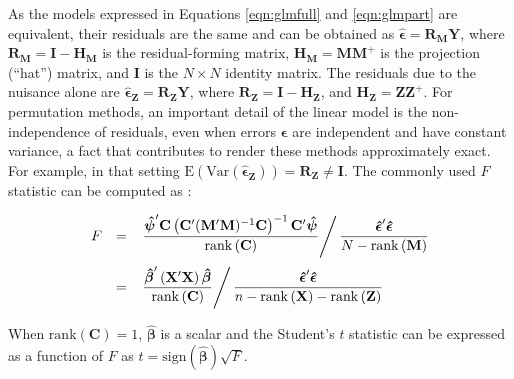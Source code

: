As the models expressed in Equations \ref{eqn:glmfull} and \ref{eqn:glmpart} are equivalent, their residuals are the same and can be obtained as  $\boldsymbol{\hat{\epsilon}} = \mathbf{R}_{\mathbf{M}}\mathbf{Y}$, where $\mathbf{R}_{\mathbf{M}}=\mathbf{I}-\mathbf{H}_{\mathbf{M}}$ is the residual-forming matrix, $\mathbf{H}_{\mathbf{M}}=\mathbf{M}\mathbf{M}^{+}$ is the projection (``hat'') matrix, and $\mathbf{I}$ is the $N \times N$ identity matrix. The residuals due to the nuisance alone are $\boldsymbol{\hat{\epsilon}}_{\mathbf{Z}} = \mathbf{R}_{\mathbf{Z}}\mathbf{Y}$, where $\mathbf{R}_{\mathbf{Z}}=\mathbf{I}-\mathbf{H}_{\mathbf{Z}}$, and $\mathbf{H}_{\mathbf{Z}} = \mathbf{Z}\mathbf{Z}^{+}$. For permutation methods, an important detail of the linear model is the non-independence of residuals, even when errors $\boldsymbol{\epsilon}$ are independent and have constant variance, a fact that contributes to render these methods approximately exact. For example, in that setting $\mathrm{E}\left(\mathrm{Var}(\boldsymbol{\hat{\epsilon}_{\mathbf{Z}}})\right)=\mathbf{R}_{\mathbf{Z}}\neq\mathbf{I}$. The commonly used $F$ statistic can be computed as \citep{Christensen2002}:

\begin{equation}
\begin{array}{ccl}
F &=& \left.\dfrac{\boldsymbol{\hat{\psi}}'\mathbf{C} \left(\mathbf{C}'(\mathbf{M}'\mathbf{M})^{-1}\mathbf{C} \right)^{-1} \mathbf{C}'\boldsymbol{\hat{\psi}}}{\mathrm{rank}\left(\mathbf{C}\right)} \right/ \dfrac{\boldsymbol{\hat{\epsilon}}'\boldsymbol{\hat{\epsilon}}}{N-\mathrm{rank}\left(\mathbf{M}\right)}\\[15pt]
{} & = & \left.\dfrac{\boldsymbol{\hat{\beta}}' \left(\mathbf{X}'\mathbf{X}\right)\boldsymbol{\hat{\beta}}}{\mathrm{rank}\left(\mathbf{C}\right)} \right/ \dfrac{\boldsymbol{\hat{\epsilon}}'\boldsymbol{\hat{\epsilon}}}{n-\mathrm{rank}\left(\mathbf{X}\right)-\mathrm{rank}\left(\mathbf{Z}\right)}
\end{array}
\label{eqn:fstat}
\end{equation}

\noindent
When $\mathrm{rank}(\mathbf{C}) = 1$, $\boldsymbol{\hat{\beta}}$ is a scalar and the Student's $t$ statistic can be expressed as a function of $F$ as $t=\mathrm{sign}(\boldsymbol{\hat{\beta}})\sqrt{F}$.

